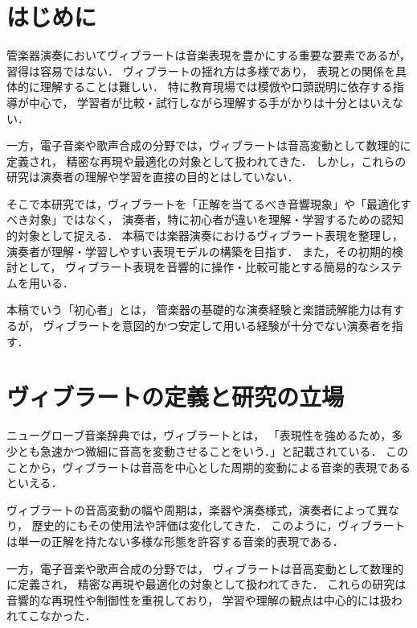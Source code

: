 

\section{はじめに}

管楽器演奏においてヴィブラートは音楽表現を豊かにする重要な要素であるが，習得は容易ではない．
ヴィブラートの揺れ方は多様であり，
表現との関係を具体的に理解することは難しい．
特に教育現場では模倣や口頭説明に依存する指導が中心で，
学習者が比較・試行しながら理解する手がかりは十分とはいえない．

一方，電子音楽や歌声合成の分野では，ヴィブラートは音高変動として数理的に定義され，
精密な再現や最適化の対象として扱われてきた．
しかし，これらの研究は演奏者の理解や学習を直接の目的とはしていない．

そこで本研究では，ヴィブラートを「正解を当てるべき音響現象」や「最適化すべき対象」ではなく，
演奏者，特に初心者が違いを理解・学習するための認知的対象として捉える．
本稿では楽器演奏におけるヴィブラート表現を整理し，
演奏者が理解・学習しやすい表現モデルの構築を目指す．
また，その初期的検討として，
ヴィブラート表現を音響的に操作・比較可能とする簡易的なシステムを用いる．

本稿でいう「初心者」とは，
管楽器の基礎的な演奏経験と楽譜読解能力は有するが，
ヴィブラートを意図的かつ安定して用いる経験が十分でない演奏者を指す．

\section{ヴィブラートの定義と研究の立場}

ニューグローブ音楽辞典\cite{Niyugurovu}では，ヴィブラートとは，
「表現性を強めるため，多少とも急速かつ微細に音高を変動させることをいう．」と記載されている．
このことから，ヴィブラートは音高を中心とした周期的変動による音楽的表現であるといえる．

ヴィブラートの音高変動の幅や周期は，楽器や演奏様式，演奏者によって異なり，
歴史的にもその使用法や評価は変化してきた．
このように，ヴィブラートは単一の正解を持たない多様な形態を許容する音楽的表現である．

一方，電子音楽や歌声合成の分野では，
ヴィブラートは音高変動として数理的に定義され，
精密な再現や最適化の対象として扱われてきた．
これらの研究は音響的な再現性や制御性を重視しており，
学習や理解の観点は中心的には扱われてこなかった．

